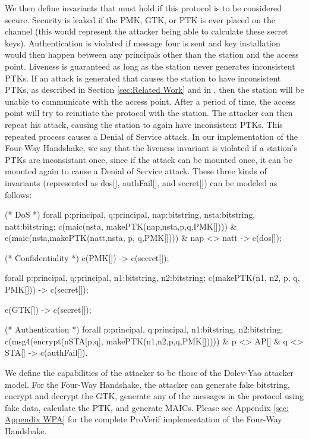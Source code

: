 \documentclass[11pt, twocolumn]{article} %
\begin{document}
{We then define invariants that must hold if this protocol is to be considered secure.  Security is leaked if the PMK, GTK, or PTK is ever placed on the channel (this would represent the attacker being able to calculate these secret keys).  Authentication is violated if message four is sent and key installation would then happen between any principals other than the station and the access point.  Liveness is guaranteed as long as the station never generates inconsistent PTKs.  If an attack is generated that causes the station to have inconsistent PTKs, as described in Section \ref{sec:Related Work} and in \cite{he04}, then the station will be unable to communicate with the access point.  After a period of time, the access point will try to reinitiate the protocol with the station.  The attacker can then repeat his attack, causing the station to again have inconsistent PTKs.  This repeated process causes a Denial of Service attack.  In our implementation of the Four-Way Handshake, we say that the liveness invariant is violated if a station's PTKs are inconsistant once, since if the attack can be mounted once, it can be mounted again to cause a Denial of Service attack.  These three kinds of invariants (represented as dos[], authFail[], and secret[]) can be modeled as follows:

\begin{verbatimtab}[3]
(* DoS *)
forall p:principal, q:principal, 
	nap:bitstring, nsta:bitstring, 
		natt:bitstring; c(maic(nsta,
			makePTK(nap,nsta,p,q,PMK[]))) & 
				c(maic(nsta,makePTK(natt,nsta,
					p, q,PMK[]))) & 
						nap <> natt -> c(dos[]); 

(* Confidentiality *)
c(PMK[]) -> c(secret[]);

forall p:principal, q:principal, 
	n1:bitstring, n2:bitstring; 
		c(makePTK(n1, n2, p, q, PMK[])) 
			-> c(secret[]); 

c(GTK[]) -> c(secret[]);

(* Authentication *)
forall p:principal, q:principal, 
	n1:bitstring, n2:bitstring; 
		c(msg4(encrypt(nSTA[p,q],
			makePTK(n1,n2,p,q,PMK[])))) 
				& p <> AP[] & 
					q <> STA[] -> c(authFail[]).
\end{verbatimtab}

We define the capabilities of the attacker to be those of the Dolev-Yao attacker model.  For the Four-Way Handshake, the attacker can generate fake bitstring, encrypt and decrypt the GTK, generate any of the messages in the protocol using fake data, calculate the PTK, and generate MAICs.  Please see Appendix \ref{sec: Appendix WPA} for the complete ProVerif implementation of the Four-Way Handshake.

}
\end{document}

